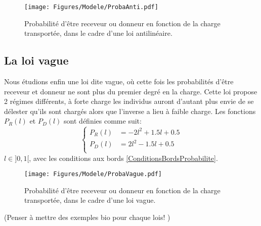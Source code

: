 \begin{figure}[h]
\centering
\texttt{[image: Figures/Modele/ProbaAnti.pdf]}
\caption{Probabilité d'être receveur ou donneur en fonction de la charge transportée, dans le cadre d'une loi antilinéaire.}
\label{ProbaAnti}
\end{figure}

\subsection{La loi vague}
Nous étudions enfin une loi dite vague, où cette fois les probabilités d'être receveur et donneur ne sont plus du premier degré en la charge. Cette loi propose 2 régimes différents, à forte charge les individus auront d'autant plus envie de se délester qu'ils sont chargés alors que l'inverse a lieu à faible charge. Les fonctions $P_R(l)$ et $P_D(l)$ sont définies comme suit:
\begin{equation}
\left \{
\begin{aligned}
P_R (l) &= -2l^2+1.5l+0.5\\
P_D (l) &= 2l^2-1.5l+0.5\\
\end{aligned}
\right.
\label{PRVague}
\end{equation}
$l\in]0,1[$, avec les conditions aux bords \ref{ConditionsBordsProbabilite}.

\begin{figure}[h]
\centering
\texttt{[image: Figures/Modele/ProbaVague.pdf]}
\caption{Probabilité d'être receveur ou donneur en fonction de la charge transportée, dans le cadre d'une loi vague.}
\label{ProbaVague}
\end{figure}

(Penser à mettre des exemples bio pour chaque lois! \fixme)